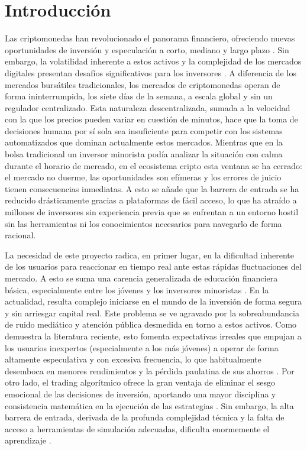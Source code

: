 \chapter{Introducción}
\label{chap:introduccion}

Las criptomonedas han revolucionado el panorama financiero, ofreciendo nuevas oportunidades de inversión y especulación a corto, mediano y largo plazo \parencite{baur_bitcoin_2017}. Sin embargo, la volatilidad inherente a estos activos y la complejidad de los mercados digitales presentan desafíos significativos para los inversores \parencite{katsiampa_volatility_2017}. A diferencia de los mercados bursátiles tradicionales, los mercados de criptomonedas operan de forma ininterrumpida, los siete días de la semana, a escala global y sin un regulador centralizado. Esta naturaleza descentralizada, sumada a la velocidad con la que los precios pueden variar en cuestión de minutos, hace que la toma de decisiones humana por sí sola sea insuficiente para competir con los sistemas automatizados que dominan actualmente estos mercados. Mientras que en la bolsa tradicional un inversor minorista podía analizar la situación con calma durante el horario de mercado, en el ecosistema cripto esta ventana se ha cerrado: el mercado no duerme, las oportunidades son efímeras y los errores de juicio tienen consecuencias inmediatas. A esto se añade que la barrera de entrada se ha reducido drásticamente gracias a plataformas de fácil acceso, lo que ha atraído a millones de inversores sin experiencia previa que se enfrentan a un entorno hostil sin las herramientas ni los conocimientos necesarios para navegarlo de forma racional.

La necesidad de este proyecto radica, en primer lugar, en la dificultad inherente de los usuarios para reaccionar en tiempo real ante estas rápidas fluctuaciones del mercado. A esto se suma una carencia generalizada de educación financiera básica, especialmente entre los jóvenes y los inversores minoristas \parencite{lusardi_economic_2014}. En la actualidad, resulta complejo iniciarse en el mundo de la inversión de forma segura y sin arriesgar capital real. Este problema se ve agravado por la sobreabundancia de ruido mediático y atención pública desmedida en torno a estos activos. Como demuestra la literatura reciente, esto fomenta expectativas irreales que empujan a los usuarios inexpertos (especialmente a los más jóvenes) a operar de forma altamente especulativa y con excesiva frecuencia, lo que habitualmente desemboca en menores rendimientos y la pérdida paulatina de sus ahorros \parencite{hasso_who_2019}. Por otro lado, el trading algorítmico ofrece la gran ventaja de eliminar el sesgo emocional de las decisiones de inversión, aportando una mayor disciplina y consistencia matemática en la ejecución de las estrategias \parencite{chan_algorithmic_2013}. Sin embargo, la alta barrera de entrada, derivada de la profunda complejidad técnica y la falta de acceso a herramientas de simulación adecuadas, dificulta enormemente el aprendizaje \parencite{treleaven_algorithmic_2013}.

